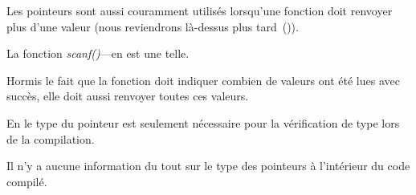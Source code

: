 Les pointeurs sont aussi couramment utilisés lorsqu'une fonction doit renvoyer plus
d'une valeur (nous reviendrons là-dessus plus tard~()).

La fonction \emph{scanf()}---en est une telle.

Hormis le fait que la fonction doit indiquer combien de valeurs ont été lues avec
succès, elle doit aussi renvoyer toutes ces valeurs.

En \CCpp le type du pointeur est seulement nécessaire pour la vérification de type
lors de la compilation.

Il n'y a aucune information du tout sur le type des pointeurs à l'intérieur du code compilé.





